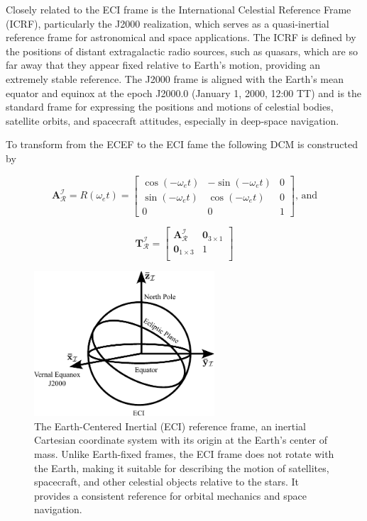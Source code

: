 \noindent Closely related to the ECI frame is the International Celestial Reference Frame (ICRF), particularly the J2000 realization, which serves as a 
quasi-inertial reference frame for astronomical and space applications. The ICRF is defined by the positions of distant extragalactic radio sources, such as quasars, 
which are so far away that they appear fixed relative to Earth's motion, providing an extremely stable reference. The J2000 frame is aligned with the Earth's 
mean equator and equinox at the epoch J2000.0 (January 1, 2000, 12:00 TT) and is the standard frame for expressing the positions and motions of celestial bodies, 
satellite orbits, and spacecraft attitudes, especially in deep-space navigation.
\vspace{0.5cm}

\noindent To transform from the ECEF to the ECI fame the following DCM is constructed by

\begin{equation}
    \mathbf{A}_{\mathcal{R}}^{\mathcal{I}} = R(\omega_e t) = 
    \begin{bmatrix}
        \cos(-\omega_e t) & -\sin(-\omega_e t) & 0\\
        \sin(-\omega_e t) & \cos(-\omega_e t) & 0\\
        0 & 0 & 1
    \end{bmatrix}
    \text{, and}
\end{equation}

\begin{equation}
    \mathbf{T}_\mathcal{R}^\mathcal{I} =
    \begin{bmatrix}
    \mathbf{A}_\mathcal{R}^\mathcal{I} & \mathbf{0}_{3\times1} \\
    \mathbf{0}_{1\times3} & 1 \\
    \end{bmatrix}
\end{equation}

\begin{figure}[H]
    \centering
    \includegraphics[width=0.6\textwidth]{figures/modelling/ECI.pdf}
    \caption{The Earth-Centered Inertial (ECI) reference frame, an inertial Cartesian coordinate system with its origin at the Earth's center of mass. Unlike Earth-fixed frames, the ECI frame does not rotate with the Earth, making it suitable for describing the motion of satellites, spacecraft, and other celestial objects relative to the stars. It provides a consistent reference for orbital mechanics and space navigation.}
    \label{fig:3.11}
\end{figure}

